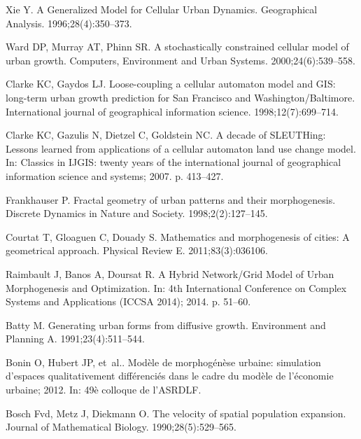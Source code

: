 \documentclass[10pt,letterpaper]{article}
\begin{document}
\begin{thebibliography}{10}
Xie Y.
\newblock A Generalized Model for Cellular Urban Dynamics.
\newblock Geographical Analysis. 1996;28(4):350--373.

Ward DP, Murray AT, Phinn SR.
\newblock A stochastically constrained cellular model of urban growth.
\newblock Computers, Environment and Urban Systems. 2000;24(6):539--558.

Clarke KC, Gaydos LJ.
\newblock Loose-coupling a cellular automaton model and GIS: long-term urban
  growth prediction for San Francisco and Washington/Baltimore.
\newblock International journal of geographical information science.
  1998;12(7):699--714.

Clarke KC, Gazulis N, Dietzel C, Goldstein NC.
\newblock A decade of SLEUTHing: Lessons learned from applications of a
  cellular automaton land use change model.
\newblock In: Classics in IJGIS: twenty years of the international journal of
  geographical information science and systems; 2007. p. 413--427.

Frankhauser P.
\newblock Fractal geometry of urban patterns and their morphogenesis.
\newblock Discrete Dynamics in Nature and Society. 1998;2(2):127--145.

Courtat T, Gloaguen C, Douady S.
\newblock Mathematics and morphogenesis of cities: A geometrical approach.
\newblock Physical Review E. 2011;83(3):036106.

Raimbault J, Banos A, Doursat R.
\newblock A Hybrid Network/Grid Model of Urban Morphogenesis and Optimization.
\newblock In: 4th International Conference on Complex Systems and Applications
  (ICCSA 2014); 2014. p. 51--60.

Batty M.
\newblock Generating urban forms from diffusive growth.
\newblock Environment and Planning A. 1991;23(4):511--544.

Bonin O, Hubert JP, et~al.. Mod{\`e}le de morphog{\'e}n{\`e}se urbaine:
  simulation d'espaces qualitativement diff{\'e}renci{\'e}s dans le cadre du
  mod{\`e}le de l'{\'e}conomie urbaine; 2012.
\newblock In: 49{\`e} colloque de l'ASRDLF.

Bosch Fvd, Metz J, Diekmann O.
\newblock The velocity of spatial population expansion.
\newblock Journal of Mathematical Biology. 1990;28(5):529--565.


\end{thebibliography}
\end{document}
